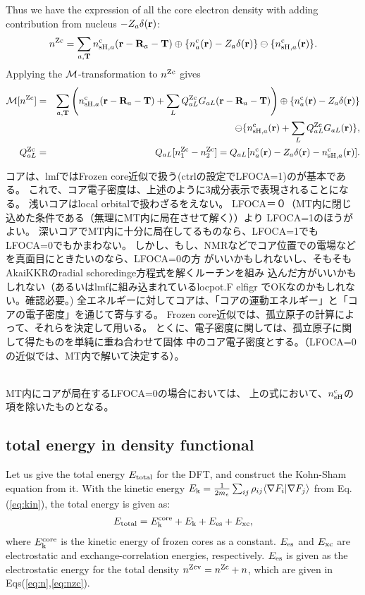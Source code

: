 \documentclass[twocolumn,showpacs,preprintnumbers,amsmath,amssymb,floatfix]{revtex4-1}
\newcommand{\bfr}{{\bf r}}
\newcommand{\bfT}{{\bf T}}
\newcommand{\bfR}{{\bf R}}
\newcommand{\ooplus}{\oplus}
\newcommand{\oominus}{\ominus}
\def\nc{n^{\rm c}}
\def\nzc{n^{\rm Zc}}
\def\nzcv{n^{\rm Zcv}}
\def\MM{{\cal M}}
\def\rhoij{\rho_{ij}}
\def\ekcore{E_{\rm k}^{\rm core}}
\def\ek{E_{\rm k}}
\def\nc{n^{\rm c}}
\def\nzc{n^{\rm Zc}}
\def\nzcv{n^{\rm Zcv}}
\def\MM{{\cal M}}
\def\rhoij{\rho_{ij}}
\def\ekcore{E_{\rm k}^{\rm core}}
\def\ek{E_{\rm k}}
\begin{document}
\begin{widetext}
Thus we have the expression of all the core electron density with adding
contribution from nucleus $-Z_a\delta(\bfr)$:
\begin{eqnarray}
\nzc = \sum_{a,\bfT} \nc_{{\rm sH},a}(\bfr-\bfR_a-\bfT) \ooplus
\{\nc_{a}(\bfr)-Z_a\delta(\bfr) \} \oominus \{\nc_{{\rm sH},a}(\bfr) \}.
\label{eq:nzc}
\end{eqnarray}
Applying the $\MM$-transformation to $\nzc$ gives
\begin{eqnarray}
\MM[\nzc]
&=& \sum_{a,\bfT} 
\left( \nc_{{\rm sH},a}(\bfr-\bfR_a-\bfT)+\sum_L Q_{aL}^{\rm Zc} G_{aL}(\bfr-\bfR_a-\bfT) \right)\ooplus
\{\nc_{a}(\bfr)-Z_a\delta(\bfr)\} \nonumber \\
&& \oominus \{ \nc_{{\rm sH},a}(\bfr)+\sum_L Q_{aL}^{\rm Zc}G_{aL}(\bfr)\},\label{eq:nc} \\
Q^{\rm Zc}_{aL} &=& Q_{aL}[\nzc_1-\nzc_2] =
Q_{aL}[\nc_{a}(\bfr)-Z_a\delta(\bfr)-\nc_{{\rm sH},a}(\bfr)] \label{eq:qalnzc}.
\end{eqnarray}


コアは、lmfではFrozen core近似で扱う(ctrlの設定でLFOCA=1)のが基本である。
これで、コア電子密度は、上述のように3成分表示で表現されることになる。
浅いコアはlocal orbitalで扱わざるをえない。
LFOCA＝０（MT内に閉じ込めた条件である（無理にMT内に局在させて解く））より
LFOCA=1のほうがよい。
深いコアでMT内に十分に局在してるものなら、LFOCA=1でもLFOCA=0でもかまわない。
しかし、もし、NMRなどでコア位置での電場などを真面目にときたいのなら、LFOCA=0の方
がいいかもしれないし、そもそもAkaiKKRのradial schoredinge方程式を解くルーチンを組み
込んだ方がいいかもしれない（あるいはlmfに組み込まれているlocpot.F elfigr
でOKなのかもしれない。確認必要。)
全エネルギーに対してコアは、「コアの運動エネルギー」と「コアの電子密度」を通じて寄与する。
Frozen core近似では、孤立原子の計算によって、それらを決定して用いる。
とくに、電子密度に関しては、孤立原子に関して得たものを単純に重ね合わせて固体
中のコア電子密度とする。（LFOCA=0の近似では、MT内で解いて決定する）。

\ \\

MT内にコアが局在するLFOCA=0の場合においては、
上の式において、$n^{\rm c}_{\rm sH}$の項を除いたものとなる。

\subsection{total energy in density functional}
\label{sec:total} Let us give the total energy $E_{\rm total}$ for the
DFT, and construct the Kohn-Sham equation from it. With the kinetic
energy $\ek=\frac{1}{2m_e} \sum_{ij} \rhoij \langle \nabla F_i| \nabla
F_{j} \rangle$ from Eq.(\ref{eq:kin}), the total energy is given as:
\begin{eqnarray}
E_{\rm total}=\ekcore+ \ek+E_{\rm es}+E_{\rm xc},
\label{eq:etot}
\end{eqnarray} 
where $\ekcore$ is the kinetic energy of frozen cores as a constant.
$E_{\rm es}$ and $E_{\rm xc}$ are electrostatic and exchange-correlation
energies, respectively.
$E_{\rm es}$ is given as the electrostatic energy for the
total density $\nzcv =\nzc +n $, which are given in
Eqs(\ref{eq:n},\ref{eq:nzc}). 


\end{widetext}
\end{document}
